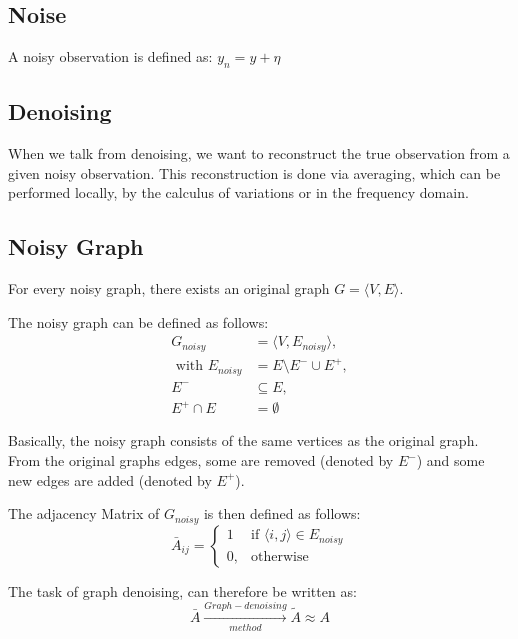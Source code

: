 \subsection{Noise}
A noisy observation is defined as:
$y_n = y + \eta$

\subsection{Denoising}
When we talk from denoising, we want to reconstruct the true observation 
from a given noisy observation. This reconstruction is done via averaging, which can be performed
locally, by the calculus of variations or in the frequency domain.

\subsection{Noisy Graph}
For every noisy graph, there exists an original graph $G = \langle V,E \rangle$.

The noisy graph can be defined as follows:
\begin{equation}
    \begin{aligned}
        G_{noisy} &= \langle V,E_{noisy} \rangle,  \\ 
        \text{ with }  E_{noisy} &= E \setminus  E^{-} \cup  E^{+}, \\ 
         E^{-} & \subseteq E, \\
         E^{+} \cap E &= \emptyset
    \end{aligned}
\end{equation}

Basically, the noisy graph consists of the same vertices as the original graph. From
the original graphs edges, some are removed (denoted by $E^{-}$) and some new edges are added
(denoted by $E^{+}$).

The adjacency Matrix of $G_{noisy}$ is then defined as follows:
\begin{equation}
    \bar{A}_{ij} =    
    \begin{cases}
        1  & \text{if } \langle i,j \rangle \in E_{noisy} \\
        0, & \text{otherwise}
    \end{cases}
\end{equation}

The task of graph denoising, can therefore be written as:
\begin{equation}
    \bar{A} \xrightarrow[method]{Graph-denoising} \tilde{A} \approx A
\end{equation}

